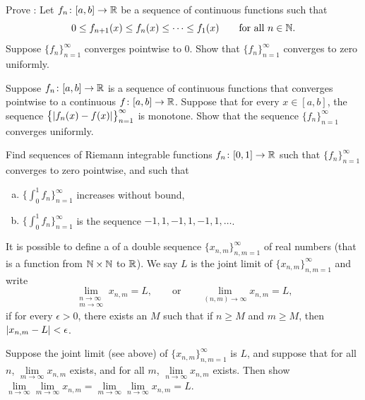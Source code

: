 \begin{exercise}[Hard] \label{exercise:dinisthm}
Prove \emph{}:
Let $f_n \colon [a,b] \to {\mathbb{R}}$ be a sequence of continuous functions such that
\begin{equation*}
0 \leq f_{n+1}(x) \leq f_n(x) \leq \cdots \leq f_1(x) 
\qquad \text{for all } n \in {\mathbb{N}}.
\end{equation*}
Suppose $\{ f_n \}_{n=1}^\infty$ converges pointwise to $0$.
Show that $\{ f_n \}_{n=1}^\infty$ converges to zero uniformly.
\end{exercise}

\begin{exercise}
Suppose $f_n \colon [a,b] \to {\mathbb{R}}$ is a sequence of continuous
functions that
converges pointwise
to a continuous $f \colon [a,b] \to {\mathbb{R}}$.  Suppose that
for every $x \in [a,b]$,
the sequence $\bigl\{ \left\lvert {f_n(x)-f(x)} \right\rvert \bigr\}_{n=1}^\infty$ is monotone.
Show that the sequence $\{f_n\}_{n=1}^\infty$ converges uniformly.
\end{exercise}

\begin{exercise}
\pagebreak[3]
Find sequences of Riemann integrable functions $f_n \colon [0,1] \to {\mathbb{R}}$ such
that $\{ f_n \}_{n=1}^\infty$ converges to zero pointwise, and such that
\begin{enumerate}[a)]
\item
$\bigl\{ \int_0^1 f_n \bigr\}_{n=1}^\infty$ increases without bound,
\item
$\bigl\{ \int_0^1 f_n \bigr\}_{n=1}^\infty$ is the sequence $-1,1,-1,1,-1,1, \ldots$.
\end{enumerate}
\end{exercise}

\begin{exnote}
It is possible to define a 
\emph{} of a double sequence
$\{ x_{n,m} \}_{n,m=1}^\infty$ of real
numbers (that is a function from ${\mathbb{N}} \times {\mathbb{N}}$ to ${\mathbb{R}}$).
We say $L$ is the joint limit of $\{ x_{n,m} \}_{n,m=1}^\infty$ and write
\begin{equation*}
\lim_{\substack{n\to\infty\\m\to\infty}}
x_{n,m} = L ,
\qquad
\text{or}
\qquad
\lim_{(n,m) \to \infty}
x_{n,m} = L ,
\end{equation*}
if for every $\epsilon > 0$, there
exists an $M$ such that if $n \geq M$ and $m \geq M$, then
$\left\lvert {x_{n,m} - L} \right\rvert < \epsilon$.
\end{exnote}

\begin{exercise}
Suppose the joint limit (see above) of $\{ x_{n,m} \}_{n,m=1}^\infty$ is $L$, and suppose
that for all $n$, $\lim\limits_{m \to \infty} x_{n,m}$ exists,
and for all $m$, $\lim\limits_{n \to \infty} x_{n,m}$ exists.  Then show
$\lim\limits_{n\to\infty}\lim\limits_{m \to \infty} x_{n,m}
=
\lim\limits_{m\to\infty}\lim\limits_{n \to \infty} x_{n,m} = L$.
\end{exercise}

